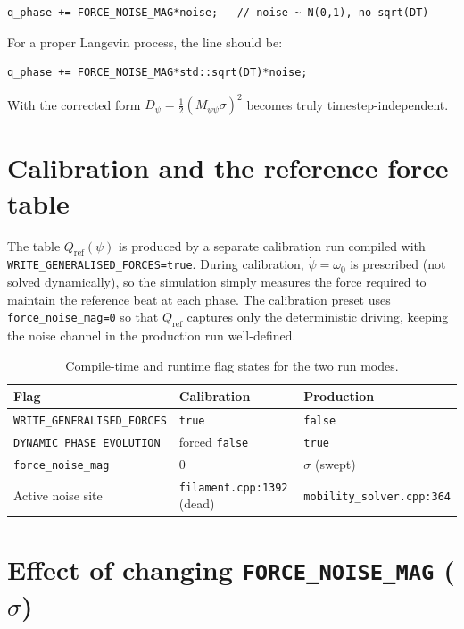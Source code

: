\documentclass[11pt,a4paper]{article}
\begin{document}
\begin{lstlisting}
q_phase += FORCE_NOISE_MAG*noise;   // noise ~ N(0,1), no sqrt(DT)
\end{lstlisting}

For a proper Langevin process, the line should be:

\begin{lstlisting}
q_phase += FORCE_NOISE_MAG*std::sqrt(DT)*noise;
\end{lstlisting}

With the corrected form $D_\psi = \tfrac{1}{2}(M_{\psi\psi}\sigma)^2$ becomes
truly timestep-independent.

\section{Calibration and the reference force table}
\label{sec:calibration}

The table $Q_{\text{ref}}(\psi)$ is produced by a separate calibration run
compiled with \texttt{WRITE\_GENERALISED\_FORCES=true}.  During calibration,
$\dot\psi = \omega_0$ is prescribed (not solved dynamically), so the
simulation simply measures the force required to maintain the reference beat
at each phase.  The calibration preset uses \texttt{force\_noise\_mag=0}
so that $Q_{\text{ref}}$ captures only the deterministic driving, keeping the
noise channel in the production run well-defined.

\begin{table}[h]
\centering
\begin{tabular}{lll}
\toprule
Flag & Calibration & Production \\
\midrule
\texttt{WRITE\_GENERALISED\_FORCES} & \texttt{true} & \texttt{false} \\
\texttt{DYNAMIC\_PHASE\_EVOLUTION}  & forced \texttt{false} & \texttt{true} \\
\texttt{force\_noise\_mag}          & $0$ & $\sigma$ (swept) \\
Active noise site & \texttt{filament.cpp:1392} (dead) & \texttt{mobility\_solver.cpp:364} \\
\bottomrule
\end{tabular}
\caption{Compile-time and runtime flag states for the two run modes.}
\end{table}

\section{Effect of changing \texttt{FORCE\_NOISE\_MAG} ($\sigma$)}
\end{document}
